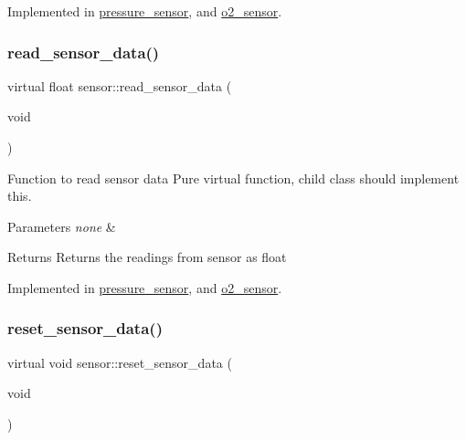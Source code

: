 Implemented in \hyperlink{group___ventilator_module_ga12b267b360a27d82a85f0b5276d433ed}{pressure\+\_\+sensor}, and \hyperlink{group___ventilator_module_ga913dbc20ebbe78e12f33075d8b0b4b1a}{o2\+\_\+sensor}.

\mbox{\label{classsensor_a682adbfb20854e2bce40b8a5c0aa6232}} 
\subsubsection{\texorpdfstring{read\+\_\+sensor\+\_\+data()}{read\_sensor\_data()}}
{\footnotesize\ttfamily virtual float sensor\+::read\+\_\+sensor\+\_\+data (\begin{DoxyParamCaption}\item[{void}]{ }\end{DoxyParamCaption})\hspace{0.3cm}{\ttfamily [pure virtual]}}



Function to read sensor data Pure virtual function, child class should implement this. 


\begin{DoxyParams}{Parameters}
{\em none} & \\
\hline
\end{DoxyParams}
\begin{DoxyReturn}{Returns}
Returns the readings from sensor as float 
\end{DoxyReturn}


Implemented in \hyperlink{group___ventilator_module_ga06b5da2de0abf739405ca3c48aa0119c}{pressure\+\_\+sensor}, and \hyperlink{group___ventilator_module_ga9601927ed36f205bdc9a8dfb55cf9657}{o2\+\_\+sensor}.

\mbox{\label{classsensor_a71fccbf71cc771db4775443bf899a5d3}} 
\subsubsection{\texorpdfstring{reset\+\_\+sensor\+\_\+data()}{reset\_sensor\_data()}}
{\footnotesize\ttfamily virtual void sensor\+::reset\+\_\+sensor\+\_\+data (\begin{DoxyParamCaption}\item[{void}]{ }\end{DoxyParamCaption})\hspace{0.3cm}{\ttfamily [pure virtual]}}



